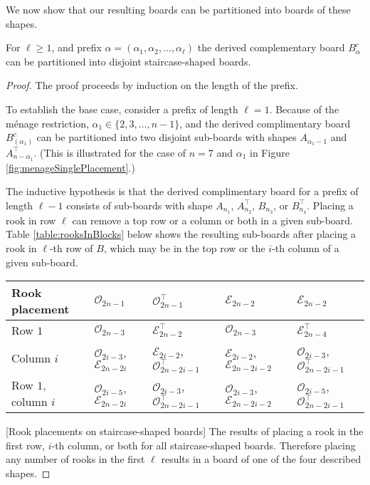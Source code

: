 We now show that our resulting boards can be partitioned into boards of these shapes.

\begin{lemma}
  For $\ell \geq 1$, and prefix $\alpha = (\alpha_1, \alpha_2, \dots, \alpha_\ell)$
  the derived complementary board $B_\alpha^c$ can be partitioned into
  disjoint staircase-shaped boards.
  \label{lemma:boardShape}
\end{lemma}
\begin{proof}
  The proof proceeds by induction on the length of the prefix.

  To establish the base case, consider a prefix of length $\ell = 1$.
  Because of the m\'enage restriction,
  $\alpha_1 \in \{2, 3, \dots, n-1\}$, and
  the derived complimentary board $B_{(\alpha_1)}^c$
  can be partitioned into two disjoint sub-boards with shapes
  $A_{\alpha_1 - 1}$ and $A^\intercal_{n - \alpha_1}$.
  (This is illustrated for the case of $n = 7$ and $\alpha_1$ in
  Figure \ref{fig:menageSinglePlacement}.)

  The inductive hypothesis is that the derived complimentary board for
  a prefix of length $\ell - 1$ consists of sub-boards with shape
  $A_{n_1}$, $A^\intercal_{n_2}$, $B_{n_3}$, or $B^\intercal_{n_4}$.
  Placing a rook in row $\ell$ can remove a top row or a column or both in a
  given sub-board.
  Table \ref{table:rooksInBlocks} below
  shows the resulting sub-boards after placing a rook in
  $\ell$-th row of $B$,
  which may be in the top row or the $i$-th column of a given sub-board.

  \begin{tabular}{|l|l|l|l|l|}
  \hline
  Rook placement
    & $\mathcal{O}_{2n-1}$
    & $\mathcal{O}_{2n-1}^\intercal$
    & $\mathcal{E}_{2n-2}$
    & $\mathcal{E}_{2n-2}$
  \\ \hline
  Row $1$
    & $\mathcal{O}_{2n-3}$
    & $\mathcal{E}_{2n-2}^\intercal$
    & $\mathcal{O}_{2n-3}$
    & $\mathcal{E}_{2n-4}^\intercal$
  \\
  Column $i$
    & $\mathcal{O}_{2i-3}$, $\mathcal{E}_{2n-2i}$
    & $\mathcal{E}_{2i-2}$, $\mathcal{O}_{2n-2i-1}^\intercal$
    & $\mathcal{E}_{2i-2}$, $\mathcal{E}_{2n-2i-2}$
    & $\mathcal{O}_{2i-3}$, $\mathcal{O}_{2n-2i-1}^\intercal$
  \\
  Row $1$, column $i$
    & $\mathcal{O}_{2i-5}$, $\mathcal{E}_{2n-2i}$
    & $\mathcal{O}_{2i-3}$, $\mathcal{O}_{2n-2i-1}^\intercal$
    & $\mathcal{O}_{2i-3}$, $\mathcal{E}_{2n-2i-2}$
    & $\mathcal{O}_{2i-5}$, $\mathcal{O}_{2n-2i-1}^\intercal$
  \\ \hline
  \end{tabular}
  [Rook placements on staircase-shaped boards]{
    The results of placing a rook in the first row, $i$-th column, or both
    for all staircase-shaped boards.
  }
  \label{table:rooksInBlocks}
  Therefore placing any number of rooks in the first $\ell$ results in a board
  of one of the four described shapes.
\end{proof}

